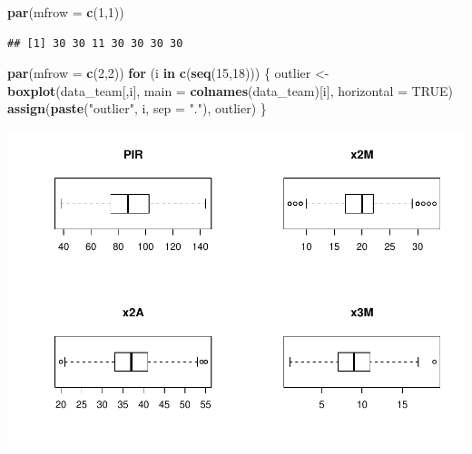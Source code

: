 \documentclass[
]{article}
\newenvironment{Shaded}{\begin{snugshade}}{\end{snugshade}}
\newcommand{\CommentTok}[1]{\textcolor[rgb]{0.56,0.35,0.01}{\textit{#1}}}
\newcommand{\ControlFlowTok}[1]{\textcolor[rgb]{0.13,0.29,0.53}{\textbf{#1}}}
\newcommand{\DataTypeTok}[1]{\textcolor[rgb]{0.13,0.29,0.53}{#1}}
\newcommand{\DecValTok}[1]{\textcolor[rgb]{0.00,0.00,0.81}{#1}}
\newcommand{\FloatTok}[1]{\textcolor[rgb]{0.00,0.00,0.81}{#1}}
\newcommand{\KeywordTok}[1]{\textcolor[rgb]{0.13,0.29,0.53}{\textbf{#1}}}
\newcommand{\NormalTok}[1]{#1}
\newcommand{\OperatorTok}[1]{\textcolor[rgb]{0.81,0.36,0.00}{\textbf{#1}}}
\newcommand{\OtherTok}[1]{\textcolor[rgb]{0.56,0.35,0.01}{#1}}
\newcommand{\StringTok}[1]{\textcolor[rgb]{0.31,0.60,0.02}{#1}}
\begin{document}
\begin{Shaded}
\begin{Highlighting}[]
\KeywordTok{par}\NormalTok{(}\DataTypeTok{mfrow =} \KeywordTok{c}\NormalTok{(}\DecValTok{1}\NormalTok{,}\DecValTok{1}\NormalTok{))}
\end{Highlighting}
\end{Shaded}

\begin{Shaded}
\end{Shaded}

\begin{verbatim}
## [1] 30 30 11 30 30 30 30
\end{verbatim}

\newpage

\begin{Shaded}
\begin{Highlighting}[]
\KeywordTok{par}\NormalTok{(}\DataTypeTok{mfrow =} \KeywordTok{c}\NormalTok{(}\DecValTok{2}\NormalTok{,}\DecValTok{2}\NormalTok{))}
\ControlFlowTok{for}\NormalTok{ (i }\ControlFlowTok{in} \KeywordTok{c}\NormalTok{(}\KeywordTok{seq}\NormalTok{(}\DecValTok{15}\NormalTok{,}\DecValTok{18}\NormalTok{))) \{}
\NormalTok{  outlier <-}\StringTok{ }\KeywordTok{boxplot}\NormalTok{(data_team[,i], }\DataTypeTok{main =} \KeywordTok{colnames}\NormalTok{(data_team)[i], }\DataTypeTok{horizontal =} \OtherTok{TRUE}\NormalTok{)}
  \KeywordTok{assign}\NormalTok{(}\KeywordTok{paste}\NormalTok{(}\StringTok{"outlier"}\NormalTok{, i, }\DataTypeTok{sep =} \StringTok{"."}\NormalTok{), outlier)}
\NormalTok{\}}
\end{Highlighting}
\end{Shaded}

\includegraphics{practica2_files/figure-latex/unnamed-chunk-33-1.pdf}
\end{document}
